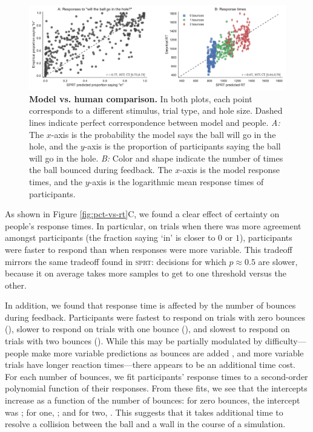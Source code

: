\documentclass[10pt,letterpaper]{article}
\begin{document}
\begin{figure}[t]
    \begin{center}
        \includegraphics[width=\textwidth]{figures/model_results.pdf}
        \caption{\textbf{Model vs. human comparison.} In both plots, each point corresponds to a different stimulus, trial type, and hole size. Dashed lines indicate perfect correspondence between model and people. \emph{A:} The $x$-axis is the probability the model says the ball will go in the hole, and the $y$-axis is the proportion of participants saying the ball will go in the hole. \emph{B:} Color and shape indicate the number of times the ball bounced during feedback. The $x$-axis is the model response times, and the $y$-axis is the logarithmic mean response times of participants.}
        \label{fig:model-results}
    \end{center}
\end{figure}

As shown in Figure \ref{fig:pct-vs-rt}C, we found a clear effect of certainty on people's response times.
In particular, on trials when there was more agreement amongst participants (the fraction saying `in' is closer to $0$ or $1$), participants were faster to respond than when responses were more variable.
This tradeoff mirrors the same tradeoff found in \textsc{sprt}: decisions for which $p\approx0.5$ are slower, because it on average takes more samples to get to one threshold versus the other.

In addition, we found that response time is affected by the number of bounces during feedback.
Participants were fastest to respond on trials with zero bounces (\RTZeroBounces{}), slower to respond on trials with one bounce (\RTOneBounces{}), and slowest to respond on trials with two bounces (\RTTwoBounces{}).
While this may be partially modulated by difficulty---people make more variable predictions as bounces are added \cite{Smith:2013fc}, and more variable trials have longer reaction times---there appears to be an additional time cost.
For each number of bounces, we fit participants' response times to a second-order polynomial function of their responses.
From these fits, we see that the intercepts increase as a function of the number of bounces: for zero bounces, the intercept was \InterceptZeroBounces{}; for one, \InterceptOneBounces{}; and for two, \InterceptTwoBounces{}.
This suggests that it takes additional time to resolve a collision between the ball and a wall in the course of a simulation.
\end{document}
